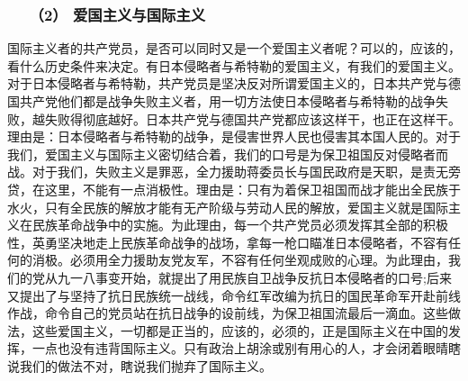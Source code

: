 \documentclass[cn,11pt,chinese]{elegantbook}
\def\myformat#1{\hfil\hfil #1}
\begin{document}
\subsubsection*{\myformat{　　（2） 爱国主义与国际主义}}
国际主义者的共产党员，是否可以同时又是一个爱国主义者呢？可以的，应该的，看什么历史条件来决定。有日本侵略者与希特勒的爱国主义，有我们的爱国主义。对于日本侵略者与希特勒，共产党员是坚决反对所谓爱国主义的，日本共产党与德国共产党他们都是战争失败主义者，用一切方法使日本侵略者与希特勒的战争失败，越失败得彻底越好。日本共产党与德国共产党都应该这样干，也正在这样干。理由是：日本侵略者与希特勒的战争，是侵害世界人民也侵害其本国人民的。对于我们，爱国主义与国际主义密切结合着，我们的口号是为保卫祖国反对侵略者而战。对于我们，失败主义是罪恶，全力援助蒋委员长与国民政府是天职，是责无旁贷，在这里，不能有一点消极性。理由是：只有为着保卫祖国而战才能出全民族于水火，只有全民族的解放才能有无产阶级与劳动人民的解放，爱国主义就是国际主义在民族革命战争中的实施。为此理由，每一个共产党员必须发挥其全部的积极性，英勇坚决地走上民族革命战争的战场，拿每一枪口瞄准日本侵略者，不容有任何的消极。必须用全力援助友党友军，不容有任何坐观成败的心理。为此理由，我们的党从九一八事变开始，就提出了用民族自卫战争反抗日本侵略者的口号;后来又提出了与坚持了抗日民族统一战线，命令红军改编为抗日的国民革命军开赴前线作战，命令自己的党员站在抗日战争的设前线，为保卫祖国流最后一滴血。这些做法，这些爱国主义，一切都是正当的，应该的，必须的，正是国际主义在中国的发挥，一点也没有违背国际主义。只有政治上胡涂或别有用心的人，才会闭着眼晴瞎说我们的做法不对，瞎说我们抛弃了国际主义。\\
\end{document}
